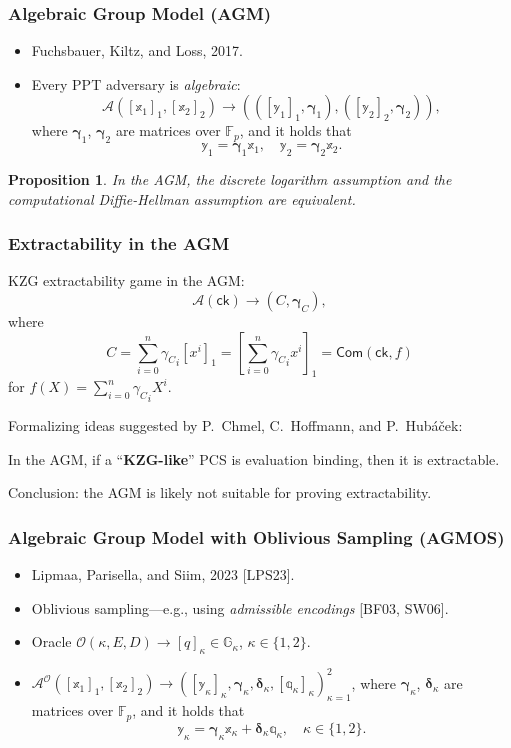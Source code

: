 \documentclass[9pt]{beamer}
\newcommand{\F}{\mathbb{F}}
\newcommand{\G}{\mathbb{G}}
\newcommand{\Com}{\mathsf{Com}}
\newcommand{\ck}{\mathsf{ck}}  %
\newcommand{\A}{\mathcal A}  %
\newcommand{\Oracle}{\mathcal{O}}  %
\newtheorem{proposition}{Proposition}
\begin{document}
\begin{frame}
\frametitle{Algebraic Group Model (AGM)}
\begin{itemize}
    \item Fuchsbauer, Kiltz, and Loss, 2017.
    \item Every PPT adversary is \textit{algebraic}:
    $$
    \A([\mathbb x_1]_1, [\mathbb x_2]_2) \to (([\mathbb y_1]_1, \bm \gamma_1), ([\mathbb y_2]_2, \bm \gamma_2)),
    $$
    where $ \bm{\gamma}_1 $, $ \bm{\gamma}_2 $ are matrices over $ \F_p $, and it holds that 
    \begin{equation*}
    \mathbb y_1 = \bm{\gamma}_1 \mathbb x_1, \quad 
    \mathbb y_2 = \bm{\gamma}_2 \mathbb x_2. 
    \end{equation*}
\end{itemize}
\begin{proposition}
    In the AGM, the discrete logarithm assumption and the computational Diffie-Hellman assumption are equivalent.
\end{proposition}
\end{frame}


\begin{frame}
\frametitle{Extractability in the AGM}
KZG extractability game in the AGM:
\[
\A(\ck) \to (C, \bm \gamma_C),
\]
where 
\[
C = \sum_{i=0}^n {\gamma_C}_i [x^i]_1 = 
\left[ \sum_{i=0}^n {\gamma_C}_i x^i \right]_1 = 
\Com(\ck, f)
\]
for $ f(X) = \sum_{i=0}^n {\gamma_C}_i X^i $.

Formalizing ideas suggested by P.\ Chmel, C.\ Hoffmann, and P.\ Hubáček:
\begin{theorem}[informal]
In the AGM, if a ``\textbf{KZG-like}'' PCS is evaluation binding, then it is extractable.
\end{theorem}
Conclusion: the AGM is likely not suitable for proving extractability. 
\end{frame}


\begin{frame}
\frametitle{Algebraic Group Model with Oblivious Sampling (AGMOS)}
\begin{itemize}
    \item Lipmaa, Parisella, and Siim, 2023 [LPS23].
    \item Oblivious sampling---e.g., using \emph{admissible encodings} [BF03, SW06].
    \item Oracle $ \Oracle(\kappa, E, D) \to [q]_\kappa \in \G_\kappa $, $ \kappa \in \{ 1, 2 \} $.
    \item \(
    \A^{\Oracle}([\mathbb x_1]_1, [\mathbb x_2]_2) \to
    ([\mathbb y_\kappa]_\kappa, \bm \gamma_\kappa, \bm \delta_\kappa, [\mathbb q_\kappa]_\kappa)_{\kappa=1}^2
    \), where $ \bm{\gamma}_\kappa $, $ \bm{\delta}_\kappa $ are matrices over $ \F_p $, and it holds that 
    \begin{equation*}
    \mathbb y_\kappa = \bm{\gamma}_\kappa \mathbb x_\kappa + \bm \delta_\kappa \mathbb q_\kappa, \quad 
    \kappa \in \{ 1, 2 \}.
    \end{equation*}
\end{itemize}   
\end{frame}
\end{document}

